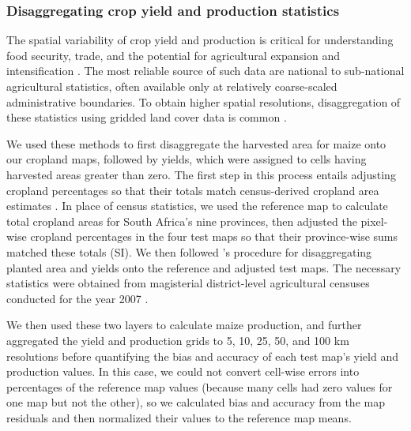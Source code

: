 \documentclass[12 pt, titlepage, a4paper]{article}
\newcommand{\citetapos}[1]{\citeauthor{#1}'s \citeyearpar{#1}}
\begin{document}
\subsubsection*{Disaggregating crop yield and production statistics}
\vspace{-0.2 cm}
The spatial variability of crop yield and production is critical for understanding food security, trade, and the potential for agricultural expansion and intensification \citep{licker_mind_2010,monfreda_farming_2008}. The most reliable source of such data are national to sub-national agricultural statistics, often available only at relatively coarse-scaled administrative boundaries. To obtain higher spatial resolutions, disaggregation of these statistics using gridded land cover data is common \citep{ramankutty_farming_2008, monfreda_farming_2008,schierhorn_post-soviet_2013}. 

We used these methods to first disaggregate the harvested area for maize \citep[South Africa's largest crop;][]{estes_projected_2013} onto our cropland maps, followed by yields, which were assigned to cells having harvested areas greater than zero. The first step in this process entails adjusting cropland percentages so that their totals match census-derived cropland area estimates \citep{ramankutty_farming_2008,schierhorn_post-soviet_2013}. In place of census statistics, we used the reference map to calculate total cropland areas for South Africa's nine provinces, then adjusted the pixel-wise cropland percentages in the four test maps so that their province-wise sums matched these totals (SI). We then followed \citetapos{monfreda_farming_2008} procedure for disaggregating planted area and yields onto the reference and adjusted test maps. The necessary statistics were obtained from magisterial district-level agricultural censuses conducted for the year 2007 \citep{statistics_south_africa_building_2007}. 

We then used these two layers to calculate maize production, and further aggregated the yield and production grids to 5, 10, 25, 50, and 100 km resolutions before quantifying the bias and accuracy of each test map's yield and production values. In this case, we could not convert cell-wise errors into percentages of the reference map values (because many cells had zero values for one map but not the other), so we calculated bias and accuracy from the map residuals and then normalized their values to the reference map means. 

\vspace{-0.3 cm}
\end{document}
